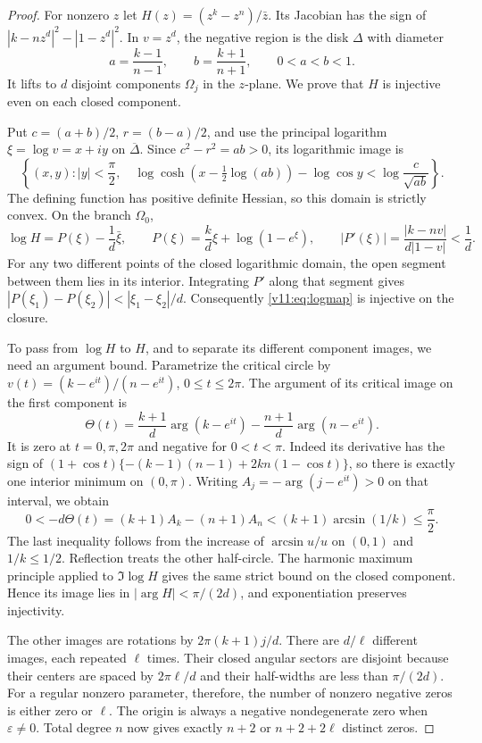 \documentclass[UTF8,11pt]{ctexart}
\theoremstyle{definition}
\numberwithin{equation}{section}
\begin{document}
\begin{proof}
For nonzero $z$ let $H(z)=(z^k-z^n)/\bar z$.
Its Jacobian has the sign of
$|k-nz^d|^2-|1-z^d|^2$.
In $v=z^d$, the negative region is the disk $\Delta$ with diameter
\[
 a=\frac{k-1}{n-1},\qquad b=\frac{k+1}{n+1},\qquad 0<a<b<1.
\]
It lifts to $d$ disjoint components $\Omega_j$ in the $z$-plane.
We prove that $H$ is injective even on each closed component.

Put $c=(a+b)/2$, $r=(b-a)/2$, and use the principal logarithm
$\xi=\log v=x+iy$ on $\overline\Delta$.
Since $c^2-r^2=ab>0$, its logarithmic image is
\begin{equation}\label{v11:eq:convexlogdisk}
 \left\{(x,y): |y|<\frac\pi2,\quad
 \log\cosh\left(x-\tfrac12\log(ab)\right)-\log\cos y
 <\log\frac c{\sqrt{ab}}\right\}.
\end{equation}
The defining function has positive definite Hessian, so this
domain is strictly convex. On the branch $\Omega_0$,
\begin{equation}\label{v11:eq:logmap}
 \log H=P(\xi)-\frac1d\bar\xi,
 \qquad P(\xi)=\frac kd\xi+\log(1-e^\xi),
 \qquad
 |P'(\xi)|=\frac{|k-nv|}{d|1-v|}<\frac1d.
\end{equation}
For any two different points of the closed logarithmic domain,
the open segment between them lies in its interior. Integrating
$P'$ along that segment gives
$|P(\xi_1)-P(\xi_2)|<|\xi_1-\xi_2|/d$.
Consequently \eqref{v11:eq:logmap} is injective on the closure.

To pass from $\log H$ to $H$, and to separate its different
component images, we need an argument bound. Parametrize the
critical circle by $v(t)=(k-e^{it})/(n-e^{it})$, $0\le t\le2\pi$.
The argument of its critical image on the first component is
\[
 \Theta(t)=\frac{k+1}{d}\arg(k-e^{it})
           -\frac{n+1}{d}\arg(n-e^{it}).
\]
It is zero at $t=0,\pi,2\pi$ and negative for $0<t<\pi$.
Indeed its derivative has the sign of
$(1+\cos t)\{-(k-1)(n-1)+2kn(1-\cos t)\}$,
so there is exactly one interior minimum on $(0,\pi)$.
Writing $A_j=-\arg(j-e^{it})>0$ on that interval, we obtain
\[
 0<-d\Theta(t)=(k+1)A_k-(n+1)A_n
 <(k+1)\arcsin(1/k)\le\frac\pi2.
\]
The last inequality follows from the increase of
$\arcsin u/u$ on $(0,1)$ and $1/k\le1/2$.
Reflection treats the other half-circle. The harmonic maximum
principle applied to $\Im\log H$ gives the same strict bound
on the closed component. Hence its image lies in
$|\arg H|<\pi/(2d)$, and exponentiation preserves injectivity.

The other images are rotations by $2\pi(k+1)j/d$.
There are $d/\ell$ different images, each repeated $\ell$
times. Their closed angular sectors are disjoint because their
centers are spaced by $2\pi\ell/d$ and their half-widths are
less than $\pi/(2d)$.
For a regular nonzero parameter, therefore, the number of
nonzero negative zeros is either zero or $\ell$.
The origin is always a negative nondegenerate zero when
$\varepsilon\ne0$. Total degree $n$ now gives exactly
$n+2$ or $n+2+2\ell$ distinct zeros.


\end{proof}
\end{document}
